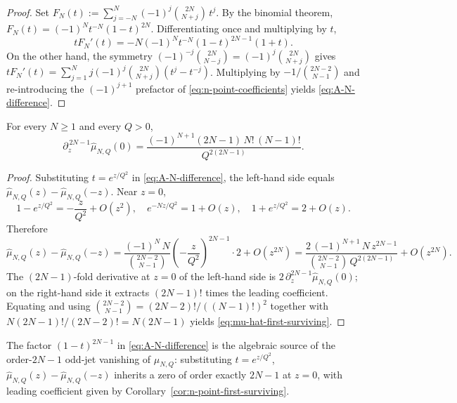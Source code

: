 \begin{proof}
Set \(F_N(t):=\sum_{j=-N}^N(-1)^j\binom{2N}{N+j}\,t^j\).  By the
binomial theorem, \(F_N(t)=(-1)^N t^{-N}(1-t)^{2N}\).  Differentiating
once and multiplying by \(t\),
\[
        t F_N'(t) = -N(-1)^N t^{-N}(1-t)^{2N-1}(1+t).
\]
On the other hand, the symmetry
\((-1)^{-j}\binom{2N}{N-j}=(-1)^j\binom{2N}{N+j}\) gives
\(tF_N'(t)=\sum_{j=1}^N j(-1)^j\binom{2N}{N+j}(t^j - t^{-j})\).
Multiplying by \(-1/\binom{2N-2}{N-1}\) and re-introducing the
\((-1)^{j+1}\) prefactor of \eqref{eq:n-point-coefficients} yields
\eqref{eq:A-N-difference}.
\end{proof}

\begin{corollary}
\label{cor:n-point-first-surviving}
For every \(N\ge 1\) and every \(Q>0\),
\begin{equation}
\label{eq:mu-hat-first-surviving}
        \partial_z^{\,2N-1}\widehat\mu_{N,Q}(0)
        = \frac{(-1)^{N+1}(2N-1)\,N!\,(N-1)!}{Q^{2(2N-1)}}.
\end{equation}
\end{corollary}

\begin{proof}
Substituting \(t=e^{z/Q^2}\) in \eqref{eq:A-N-difference}, the
left-hand side equals
\(\widehat\mu_{N,Q}(z)-\widehat\mu_{N,Q}(-z)\).  Near \(z=0\),
\[
        1-e^{z/Q^2}=-\frac{z}{Q^2}+O(z^2),\quad
        e^{-Nz/Q^2}=1+O(z),\quad
        1+e^{z/Q^2}=2+O(z).
\]
Therefore
\[
        \widehat\mu_{N,Q}(z)-\widehat\mu_{N,Q}(-z)
        = \frac{(-1)^N\,N}{\binom{2N-2}{N-1}}\!
          \left(-\frac{z}{Q^2}\right)^{\!2N-1}\!\!\!\cdot 2
          + O(z^{2N})
        = \frac{2\,(-1)^{N+1}\,N\,z^{2N-1}}
               {\binom{2N-2}{N-1}\,Q^{2(2N-1)}}+O(z^{2N}).
\]
The \((2N-1)\)-fold derivative at \(z=0\) of the left-hand side is
\(2\,\partial_z^{2N-1}\widehat\mu_{N,Q}(0)\); on the right-hand side it
extracts \((2N-1)!\) times the leading coefficient.  Equating and using
\(\binom{2N-2}{N-1}=(2N-2)!/((N-1)!)^2\) together with
\(N(2N-1)!/(2N-2)!=N(2N-1)\) yields
\eqref{eq:mu-hat-first-surviving}.
\end{proof}

\begin{remark}
\label{rem:n-point-2N-minus-1-source}
The factor \((1-t)^{2N-1}\) in \eqref{eq:A-N-difference} is the
algebraic source of the order-\(2N-1\) odd-jet vanishing of
\(\widehat\mu_{N,Q}\): substituting \(t=e^{z/Q^2}\),
\(\widehat\mu_{N,Q}(z) - \widehat\mu_{N,Q}(-z)\) inherits a zero of
order exactly \(2N-1\) at \(z=0\), with leading coefficient given by
Corollary~\ref{cor:n-point-first-surviving}.
\end{remark}


